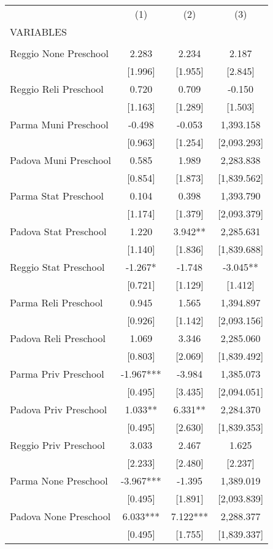 \begin{tabular}{lccc} \hline
 & (1) & (2) & (3) \\
VARIABLES &  &  &  \\ \hline
 &  &  &  \\
Reggio None Preschool & 2.283 & 2.234 & 2.187 \\
 & [1.996] & [1.955] & [2.845] \\
Reggio Reli Preschool & 0.720 & 0.709 & -0.150 \\
 & [1.163] & [1.289] & [1.503] \\
Parma Muni Preschool & -0.498 & -0.053 & 1,393.158 \\
 & [0.963] & [1.254] & [2,093.293] \\
Padova Muni Preschool & 0.585 & 1.989 & 2,283.838 \\
 & [0.854] & [1.873] & [1,839.562] \\
Parma Stat Preschool & 0.104 & 0.398 & 1,393.790 \\
 & [1.174] & [1.379] & [2,093.379] \\
Padova Stat Preschool & 1.220 & 3.942** & 2,285.631 \\
 & [1.140] & [1.836] & [1,839.688] \\
Reggio Stat Preschool & -1.267* & -1.748 & -3.045** \\
 & [0.721] & [1.129] & [1.412] \\
Parma Reli Preschool & 0.945 & 1.565 & 1,394.897 \\
 & [0.926] & [1.142] & [2,093.156] \\
Padova Reli Preschool & 1.069 & 3.346 & 2,285.060 \\
 & [0.803] & [2.069] & [1,839.492] \\
Parma Priv Preschool & -1.967*** & -3.984 & 1,385.073 \\
 & [0.495] & [3.435] & [2,094.051] \\
Padova Priv Preschool & 1.033** & 6.331** & 2,284.370 \\
 & [0.495] & [2.630] & [1,839.353] \\
Reggio Priv Preschool & 3.033 & 2.467 & 1.625 \\
 & [2.233] & [2.480] & [2.237] \\
Parma None Preschool & -3.967*** & -1.395 & 1,389.019 \\
 & [0.495] & [1.891] & [2,093.839] \\
Padova None Preschool & 6.033*** & 7.122*** & 2,288.377 \\
 & [0.495] & [1.755] & [1,839.337] \\

\end{tabular}
